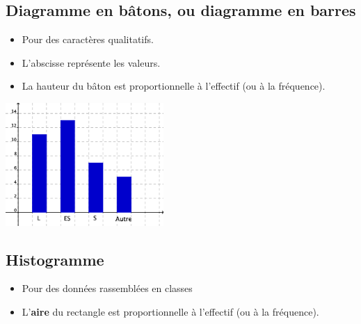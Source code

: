 \subsection{Diagramme en bâtons, ou diagramme en barres}


\begin{multicols}{2}
\begin{itemize}
\item Pour des caractères qualitatifs.
\item L'abscisse représente les valeurs.
\item La hauteur du bâton est proportionnelle à l'effectif (ou à la fréquence).
\end{itemize}

\medskip
{}
\columnbreak
  \begin{center}
    \includegraphics[width=6cm]{Stats_Fig4_DiagBaton}
  \end{center}    
\end{multicols}




\subsection{Histogramme}

\begin{itemize}
\item Pour des données rassemblées en classes
\item L'\textbf{aire} du rectangle est proportionnelle à l'effectif (ou à la
fréquence). 
\end{itemize}

